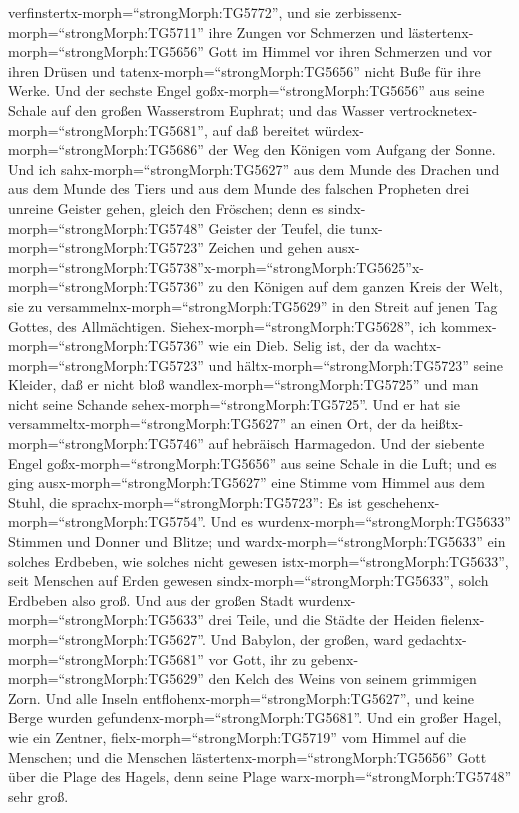 verfinstertx-morph=``strongMorph:TG5772'', und sie
zerbissenx-morph=``strongMorph:TG5711'' ihre Zungen vor Schmerzen
 und lästertenx-morph=``strongMorph:TG5656'' Gott im Himmel
vor ihren Schmerzen und vor ihren Drüsen und
tatenx-morph=``strongMorph:TG5656'' nicht Buße für ihre Werke.
 Und der sechste Engel goßx-morph=``strongMorph:TG5656''
aus seine Schale auf den großen Wasserstrom Euphrat; und das Wasser
vertrocknetex-morph=``strongMorph:TG5681'', auf daß bereitet
würdex-morph=``strongMorph:TG5686'' der Weg den Königen vom Aufgang der
Sonne.  Und ich sahx-morph=``strongMorph:TG5627'' aus dem
Munde des Drachen und aus dem Munde des Tiers und aus dem Munde des
falschen Propheten drei unreine Geister gehen, gleich den Fröschen;
 denn es sindx-morph=``strongMorph:TG5748'' Geister der
Teufel, die tunx-morph=``strongMorph:TG5723'' Zeichen und gehen
ausx-morph=``strongMorph:TG5738''\textbar x-morph=``strongMorph:TG5625''x-morph=``strongMorph:TG5736''
zu den Königen auf dem ganzen Kreis der Welt, sie zu
versammelnx-morph=``strongMorph:TG5629'' in den Streit auf jenen Tag
Gottes, des Allmächtigen. 
Siehex-morph=``strongMorph:TG5628'', ich
kommex-morph=``strongMorph:TG5736'' wie ein Dieb. Selig ist, der da
wachtx-morph=``strongMorph:TG5723'' und
hältx-morph=``strongMorph:TG5723'' seine Kleider, daß er nicht bloß
wandlex-morph=``strongMorph:TG5725'' und man nicht seine Schande
sehex-morph=``strongMorph:TG5725''.  Und er hat sie
versammeltx-morph=``strongMorph:TG5627'' an einen Ort, der da
heißtx-morph=``strongMorph:TG5746'' auf hebräisch Harmagedon.
 Und der siebente Engel goßx-morph=``strongMorph:TG5656''
aus seine Schale in die Luft; und es ging
ausx-morph=``strongMorph:TG5627'' eine Stimme vom Himmel aus dem Stuhl,
die sprachx-morph=``strongMorph:TG5723'': Es ist
geschehenx-morph=``strongMorph:TG5754''.  Und es
wurdenx-morph=``strongMorph:TG5633'' Stimmen und Donner und Blitze; und
wardx-morph=``strongMorph:TG5633'' ein solches Erdbeben, wie solches
nicht gewesen istx-morph=``strongMorph:TG5633'', seit Menschen auf Erden
gewesen sindx-morph=``strongMorph:TG5633'', solch Erdbeben also groß.
 Und aus der großen Stadt
wurdenx-morph=``strongMorph:TG5633'' drei Teile, und die Städte der
Heiden fielenx-morph=``strongMorph:TG5627''. Und Babylon, der großen,
ward gedachtx-morph=``strongMorph:TG5681'' vor Gott, ihr zu
gebenx-morph=``strongMorph:TG5629'' den Kelch des Weins von seinem
grimmigen Zorn.  Und alle Inseln
entflohenx-morph=``strongMorph:TG5627'', und keine Berge wurden
gefundenx-morph=``strongMorph:TG5681''.  Und ein großer
Hagel, wie ein Zentner, fielx-morph=``strongMorph:TG5719'' vom Himmel
auf die Menschen; und die Menschen
lästertenx-morph=``strongMorph:TG5656'' Gott über die Plage des Hagels,
denn seine Plage warx-morph=``strongMorph:TG5748'' sehr groß.

